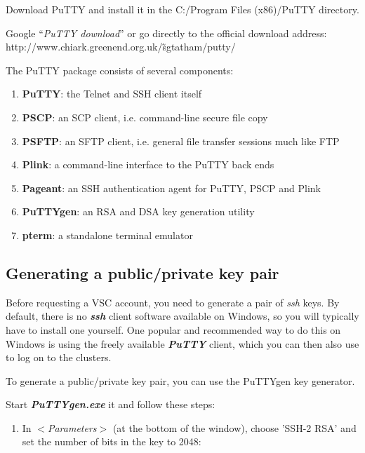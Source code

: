  Download PuTTY and install it in the C:/Program Files (x86)/PuTTY directory.

  Google ``\textit{PuTTY download}'' or go directly to the official download
  address: http://www.chiark.greenend.org.uk/\~sgtatham/putty/

  The PuTTY package consists of several components:

  \begin{enumerate}
    \item  \textbf{PuTTY}: the Telnet and SSH client itself
    \item  \textbf{PSCP}: an SCP client, i.e. command-line secure file copy
    \item  \textbf{PSFTP}: an SFTP client, i.e. general file transfer sessions much like FTP
    \item  \textbf{Plink}: a command-line interface to the PuTTY back ends
    \item  \textbf{Pageant}: an SSH authentication agent for PuTTY, PSCP and Plink
    \item  \textbf{PuTTYgen}: an RSA and DSA key generation utility
    \item  \textbf{pterm}: a standalone terminal emulator
  \end{enumerate}

  \subsection{Generating a public/private key pair}
  \label{sec:generate-key-pair}

  Before requesting a VSC account, you need to generate a pair of \textit{ssh}
  keys. By default, there is no \textbf{\textit{ssh}} client software available
  on Windows, so you will typically have to install one yourself. One popular and
  recommended way to do this on Windows is using the freely available
  \textbf{\textit{PuTTY}} client, which you can then also use to log on to the
  clusters.

  To generate a public/private key pair, you can use the PuTTYgen key generator.

  Start \textbf{\textit{PuTTYgen.exe}} it and follow these steps:

  \begin{enumerate}
    \item  In $<$\textit{Parameters}$>$ (at the bottom of the window), choose 'SSH-2 RSA' and set the number of bits in the key to 2048:
  \end{enumerate}

